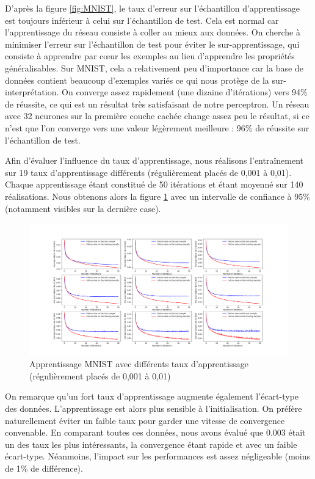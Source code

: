 D'après la figure \ref{fig:MNIST}, le taux d'erreur sur l'échantillon d'apprentissage est toujours inférieur à celui sur l'échantillon de test. Cela est normal car l'apprentissage du réseau consiste à coller au mieux aux données. On cherche à minimiser l'erreur sur l'échantillon de test pour éviter le sur-apprentissage, qui consiste à apprendre par c\oe ur les exemples au lieu d'apprendre les propriétés généralisables. Sur MNIST, cela a relativement peu d'importance car la base de données contient beaucoup d'exemples variés ce qui nous protège de la sur-interprétation. On converge assez rapidement (une dizaine d'itérations) vers 94\% de réussite, ce qui est
un résultat très satisfaisant de notre perceptron. Un réseau avec 32 neurones sur la première couche cachée change assez peu le résultat, si ce n'est que l'on converge vers une valeur légèrement meilleure : 96\% de réussite sur l'échantillon de test.

Afin d'évaluer l'influence du taux d'apprentissage, nous réalisons l'entraînement sur 19 taux d'apprentissage différents (régulièrement placés de 0,001 à 0,01). Chaque apprentissage étant constitué de 50 itérations et étant moyenné sur 140 réalisations. Nous obtenons alors la figure \ref{fig:MNIST_difLR} avec un intervalle de confiance à 95\% (notamment visibles sur la dernière case).

\begin{figure}[ht]
 \centering
 \includegraphics[width=\textwidth]{img/MNIST_difLR.png}
 \caption{Apprentissage MNIST avec différents taux d'apprentissage (régulièrement placés de 0,001 à 0,01)}
 \label{fig:MNIST_difLR}
\end{figure}

On remarque qu'un fort taux d'apprentissage augmente également l'écart-type des données. L'apprentissage est alors plus sensible à l'initialisation. On préfère naturellement éviter un faible taux pour garder une vitesse de convergence convenable. En comparant toutes ces données, nous avons évalué que 0.003 était un des taux les plus intéressants, la convergence étant rapide et avec un faible écart-type. Néanmoins, l'impact sur les performances est assez négligeable (moins de 1\% de différence).







